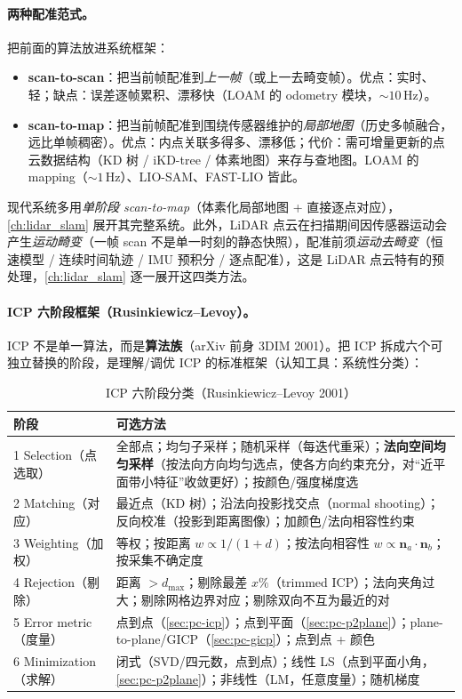 \paragraph{两种配准范式。}
把前面的算法放进系统框架\cite{carlone2026handbook,zhang2014loam}：
\begin{itemize}
  \item \textbf{scan-to-scan}：把当前帧配准到\emph{上一帧}（或上一去畸变帧）。优点：实时、轻；缺点：误差逐帧累积、漂移快（LOAM 的 odometry 模块，$\sim10\,\mathrm{Hz}$）。
  \item \textbf{scan-to-map}：把当前帧配准到围绕传感器维护的\emph{局部地图}（历史多帧融合，远比单帧稠密）。优点：内点关联多得多、漂移低；代价：需可增量更新的点云数据结构（KD 树 / iKD-tree / 体素地图）来存与查地图。LOAM 的 mapping（$\sim1\,\mathrm{Hz}$）、LIO-SAM、FAST-LIO 皆此。
\end{itemize}
现代系统多用\emph{单阶段 scan-to-map}（体素化局部地图 + 直接逐点对应），\cref{ch:lidar_slam} 展开其完整系统。此外，LiDAR 点云在扫描期间因传感器运动会产生\emph{运动畸变}（一帧 scan 不是单一时刻的静态快照），配准前须\emph{运动去畸变}（恒速模型 / 连续时间轨迹 / IMU 预积分 / 逐点配准），这是 LiDAR 点云特有的预处理，\cref{ch:lidar_slam} 逐一展开这四类方法。

\paragraph{ICP 六阶段框架（Rusinkiewicz--Levoy）。}
ICP 不是单一算法，而是\textbf{算法族}\cite{rusinkiewicz2001efficient}（arXiv 前身 3DIM 2001）。把 ICP 拆成六个可独立替换的阶段，是理解/调优 ICP 的标准框架（认知工具：系统性分类）：

\begin{table}[H]\centering\small
\caption{ICP 六阶段分类（Rusinkiewicz--Levoy 2001\cite{rusinkiewicz2001efficient}）}
\label{tab:pc-six-stages}
\begin{tabular}{p{} p{}}
\toprule
阶段 & 可选方法 \\
\midrule
1 Selection（点选取） & 全部点；均匀子采样；随机采样（每迭代重采）；\textbf{法向空间均匀采样}（按法向方向均匀选点，使各方向约束充分，对“近平面带小特征”收敛更好）；按颜色/强度梯度选 \\
2 Matching（对应） & 最近点（KD 树）；沿法向投影找交点（normal shooting）；反向校准（投影到距离图像）；加颜色/法向相容性约束 \\
3 Weighting（加权） & 等权；按距离 $w\propto1/(1+d)$；按法向相容性 $w\propto\mathbf{n}_a\cdot\mathbf{n}_b$；按采集不确定度 \\
4 Rejection（剔除） & 距离 $>d_{\max}$；剔除最差 $x\%$（trimmed ICP）；法向夹角过大；剔除网格边界对应；剔除双向不互为最近的对 \\
5 Error metric（度量） & 点到点（\cref{sec:pc-icp}）；点到平面（\cref{sec:pc-p2plane}）；plane-to-plane/GICP（\cref{sec:pc-gicp}）；点到点 + 颜色 \\
6 Minimization（求解） & 闭式（SVD/四元数，点到点）；线性 LS（点到平面小角，\cref{sec:pc-p2plane}）；非线性（LM，任意度量）；随机梯度 \\
\bottomrule
\end{tabular}
\end{table}

